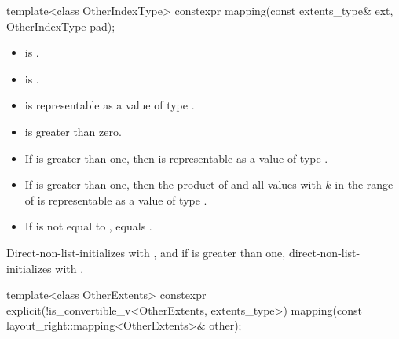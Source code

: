 %
\begin{itemdecl}
template<class OtherIndexType>
constexpr mapping(const extents_type& ext, OtherIndexType pad);
\end{itemdecl}

\begin{itemdescr}
\pnum
\constraints
\begin{itemize}
\item
{} is .
\item
{} is .
\end{itemize}

\pnum
\expects
\begin{itemize}
\item
{} is representable as a value of type .
\item
{} is greater than zero.
\item
If  is greater than one,
then 
is representable as a value of type .
\item
If  is greater than one,
then the product of
 and
all values 
with $k$ in the range of 
is representable as a value of type .
\item
If  is not equal to ,
 equals .
\end{itemize}

\pnum
\effects
Direct-non-list-initializes  with , and
if  is greater than one,
direct-non-list-initializes  with
.
\end{itemdescr}

%
\begin{itemdecl}
template<class OtherExtents>
  constexpr explicit(!is_convertible_v<OtherExtents, extents_type>)
    mapping(const layout_right::mapping<OtherExtents>& other);
\end{itemdecl}

